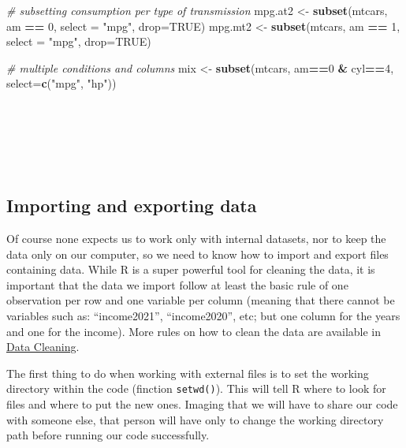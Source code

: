 \documentclass[
]{article}
\newenvironment{Shaded}{\begin{snugshade}}{\end{snugshade}}
\newcommand{\AttributeTok}[1]{\textcolor[rgb]{0.13,0.29,0.53}{#1}}
\newcommand{\CommentTok}[1]{\textcolor[rgb]{0.56,0.35,0.01}{\textit{#1}}}
\newcommand{\ConstantTok}[1]{\textcolor[rgb]{0.56,0.35,0.01}{#1}}
\newcommand{\DecValTok}[1]{\textcolor[rgb]{0.00,0.00,0.81}{#1}}
\newcommand{\FunctionTok}[1]{\textcolor[rgb]{0.13,0.29,0.53}{\textbf{#1}}}
\newcommand{\NormalTok}[1]{#1}
\newcommand{\OtherTok}[1]{\textcolor[rgb]{0.56,0.35,0.01}{#1}}
\newcommand{\SpecialCharTok}[1]{\textcolor[rgb]{0.81,0.36,0.00}{\textbf{#1}}}
\newcommand{\StringTok}[1]{\textcolor[rgb]{0.31,0.60,0.02}{#1}}
\begin{document}
\begin{Shaded}
\begin{Highlighting}[]
\CommentTok{\# subsetting consumption per type of transmission}
\NormalTok{mpg.at2 }\OtherTok{\textless{}{-}} \FunctionTok{subset}\NormalTok{(mtcars, am }\SpecialCharTok{==} \DecValTok{0}\NormalTok{, }\AttributeTok{select =} \StringTok{"mpg"}\NormalTok{, }\AttributeTok{drop=}\ConstantTok{TRUE}\NormalTok{)}
\NormalTok{mpg.mt2 }\OtherTok{\textless{}{-}} \FunctionTok{subset}\NormalTok{(mtcars, am }\SpecialCharTok{==} \DecValTok{1}\NormalTok{, }\AttributeTok{select =} \StringTok{"mpg"}\NormalTok{, }\AttributeTok{drop=}\ConstantTok{TRUE}\NormalTok{)}

\CommentTok{\# multiple conditions and columns}
\NormalTok{mix }\OtherTok{\textless{}{-}} \FunctionTok{subset}\NormalTok{(mtcars, am}\SpecialCharTok{==}\DecValTok{0} \SpecialCharTok{\&}\NormalTok{ cyl}\SpecialCharTok{==}\DecValTok{4}\NormalTok{, }\AttributeTok{select=}\FunctionTok{c}\NormalTok{(}\StringTok{"mpg"}\NormalTok{, }\StringTok{"hp"}\NormalTok{))}
\end{Highlighting}
\end{Shaded}

~

~

~

\hypertarget{importing-and-exporting-data}{%
\subsection{Importing and exporting data}\label{importing-and-exporting-data}}

Of course none expects us to work only with internal datasets, nor to
keep the data only on our computer, so we need to know how to import and
export files containing data. While R is a super powerful tool for
cleaning the data, it is important that the data we import follow at
least the basic rule of one observation per row and one variable per
column (meaning that there cannot be variables such as: ``income2021'',
``income2020'', etc; but one column for the years and one for the income).
More rules on how to clean the data are available in \protect\hyperlink{data-cleaning}{Data Cleaning}.

The first thing to do when working with external files is to set the
working directory within the code (finction \texttt{setwd()}). This will tell R
where to look for files and where to put the new ones. Imaging that we
will have to share our code with someone else, that person will have
only to change the working directory path before running our code
successfully.
\end{document}
